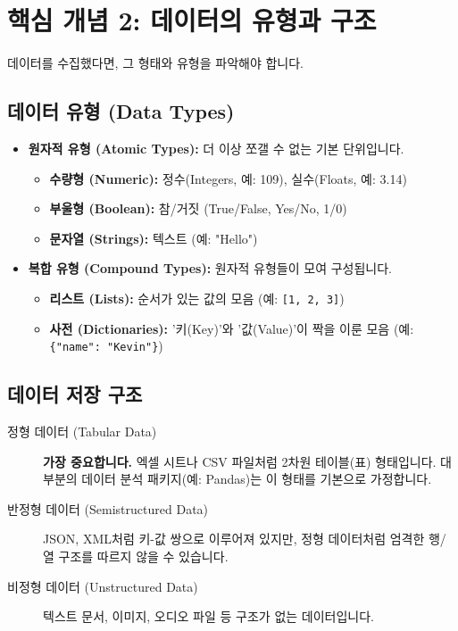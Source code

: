 \documentclass[11pt,a4paper]{book}
\theoremstyle{definition}
\begin{document}
\section{핵심 개념 2: 데이터의 유형과 구조}

데이터를 수집했다면, 그 형태와 유형을 파악해야 합니다.

\subsection{데이터 유형 (Data Types)}

\begin{itemize}
    \item \textbf{원자적 유형 (Atomic Types):} 더 이상 쪼갤 수 없는 기본 단위입니다.
    \begin{itemize}
        \item \textbf{수량형 (Numeric):} 정수(Integers, 예: 109), 실수(Floats, 예: 3.14)
        \item \textbf{부울형 (Boolean):} 참/거짓 (True/False, Yes/No, 1/0)
        \item \textbf{문자열 (Strings):} 텍스트 (예: "Hello")
    \end{itemize}
    \item \textbf{복합 유형 (Compound Types):} 원자적 유형들이 모여 구성됩니다.
    \begin{itemize}
        \item \textbf{리스트 (Lists):} 순서가 있는 값의 모음 (예: \texttt{[1, 2, 3]})
        \item \textbf{사전 (Dictionaries):} '키(Key)'와 '값(Value)'이 짝을 이룬 모음 (예: \texttt{\{"name": "Kevin"\}})
    \end{itemize}
\end{itemize}

\subsection{데이터 저장 구조}

\begin{description}
    \item[정형 데이터 (Tabular Data)]
    \textbf{가장 중요합니다.} 엑셀 시트나 CSV 파일처럼 2차원 테이블(표) 형태입니다.
    대부분의 데이터 분석 패키지(예: Pandas)는 이 형태를 기본으로 가정합니다.

    \item[반정형 데이터 (Semistructured Data)]
    JSON, XML처럼 키-값 쌍으로 이루어져 있지만, 정형 데이터처럼 엄격한 행/열 구조를 따르지 않을 수 있습니다.

    \item[비정형 데이터 (Unstructured Data)]
    텍스트 문서, 이미지, 오디오 파일 등 구조가 없는 데이터입니다.
\end{description}
\end{document}
